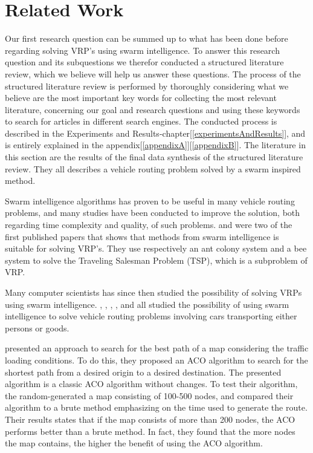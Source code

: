 \section{Related Work} 

Our first research question can be summed up to what has been done before regarding solving VRP's using swarm intelligence. To answer this research question and its subquestions we therefor conducted a structured literature review, which we believe will help us answer these questions. The process of the structured literature review is performed by thoroughly considering what we believe are the most important key words for collecting the most relevant literature, concerning our goal and research questions and using these keywords to search for articles in different search engines. The conducted process is described in the Experiments and Results-chapter[\ref{experimentsAndResults}], and is entirely explained in the appendix[\ref{appendixA}][\ref{appendixB}]. The literature in this section are the results of the final data synthesis of the structured literature review. They all describes a vehicle routing problem solved by a swarm inspired method. \newline

Swarm intelligence algorithms has proven to be useful in many vehicle routing problems, and many studies have been conducted to improve the solution, both regarding time complexity and quality, of such problems. \citet{dorigo97} and \citet{lucic03} were two of the first published papers that shows that methods from swarm intelligence is suitable for solving VRP's. They use respectively an ant colony system and a bee system to solve the Traveling Salesman Problem (TSP), which is a subproblem of VRP. 

Many computer scientists has since then studied the possibility of solving VRPs using swarm intelligence. \citet{hsiao04}, \citet{salehi-nezhad07}, \citet{tripathi09}, \citet{dias14}, and \citet{sedighpour14} all studied the possibility of using swarm intelligence to solve vehicle routing problems involving cars transporting either persons or goods. 

\citet{hsiao04} presented an approach to search for the best path of a map considering the traffic loading conditions. To do this, they proposed an ACO algorithm to search for the shortest path from a desired origin to a desired destination. The presented algorithm is a classic ACO algorithm without changes. To test their algorithm, the random-generated a map consisting of 100-500 nodes, and compared their algorithm to a brute method emphasizing on the time used to generate the route. Their results states that if the map consists of more than 200 nodes, the ACO performs better than a brute method. In fact, they found that the more nodes the map contains, the higher the benefit of using the ACO algorithm. 

